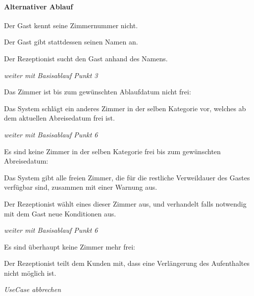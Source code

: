 \paragraph{Alternativer Ablauf}
\begin{longenum}
	\item
	\begin{longenum}
		\item Der \Gls{Gast} kennt seine Zimmernummer nicht.
		\begin{longenum}
			\item Der \Gls{Gast} gibt stattdessen seinen Namen an.
			\item Der \Gls{Rezeptionist} sucht den Gast anhand des Namens.
			\item \emph{weiter mit Basisablauf Punkt 3}
		\end{longenum}
	\end{longenum}
	
	\item
	\item
	\item
	\begin{longenum}
		\item Das \Gls{Zimmer} ist bis zum gewünschten Ablaufdatum nicht frei:
		\begin{longenum}
			\item Das System schlägt ein anderes \Gls{Zimmer} in der selben Kategorie vor, welches ab dem aktuellen Abreisedatum frei ist.
			\item \emph{weiter mit Basisablauf Punkt 6}
		\end{longenum}
		
		\item Es sind keine \Gls{Zimmer} in der selben Kategorie frei bis zum gewünschten Abreisedatum:
		\begin{longenum}
			\item Das System gibt alle freien \Gls{Zimmer}, die für die restliche Verweildauer des \Gls{Gast}es verfügbar sind, zusammen mit einer Warnung aus.
			\item Der \Gls{Rezeptionist} wählt eines dieser Zimmer aus, und verhandelt falls notwendig mit dem \Gls{Gast} neue Konditionen aus.
			\item \emph{weiter mit Basisablauf Punkt 6}
		\end{longenum}
		
		\item Es sind überhaupt keine \Gls{Zimmer} mehr frei:
		\begin{longenum}
			\item Der \Gls{Rezeptionist} teilt dem \Gls{Kunde}n mit, dass eine Verlängerung des Aufenthaltes nicht möglich ist.
			\item \emph{UseCase abbrechen}
		\end{longenum}
	\end{longenum}
	
	\item
	\item
\end{longenum}

